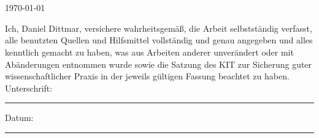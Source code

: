 \documentclass[
11pt, %
ngerman, %
singlespacing, %
nohyperref, %
headsepline, %
hidelinks,
]{MastersDoctoralThesis} %
\begin{document}
\begin{titlepage}
\begin{center}
\vfill


\groupname\\\deptname\\[2cm] %
 
\vfill

{\large \today}\\[4cm] %

 
\vfill
\end{center}
\end{titlepage}


\begin{declaration}
\addchaptertocentry{\authorshipname} %
\noindent Ich, Daniel Dittmar, versichere wahrheitsgemäß, die Arbeit selbstständig verfasst, alle benutzten Quellen und Hilfsmittel vollständig und genau angegeben und alles kenntlich gemacht zu haben, was aus Arbeiten anderer unverändert oder mit Abänderungen entnommen wurde sowie die Satzung des KIT zur Sicherung guter wissenschaftlicher Praxis in der jeweils gültigen Fassung beachtet zu haben.
 \\[0.5cm]
\noindent Unterschrift:\\
\rule[0.5em]{25em}{0.5pt} %
 
\noindent Datum:\\
\rule[0.5em]{25em}{0.5pt} %
\end{declaration}

\cleardoublepage

%
%
%
%
\end{document}
